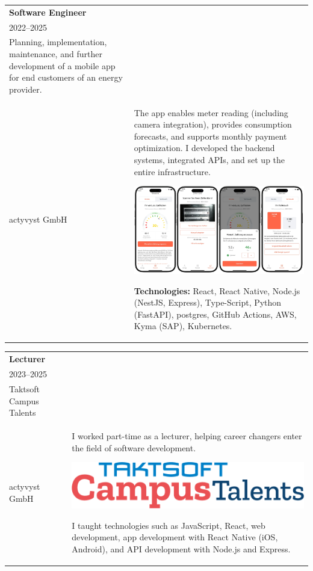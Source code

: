 \documentclass[a4paper,10pt]{article}
\begin{document}
\begin{tabularx}{\textwidth}{>{\raggedright}p{4.5cm}X}
  \textbf{\color{sectionblue}Software Engineer}                                  \\
  {\color{sectiongray}2022–2025}                                                 \\
  \vspace{1.5em}

  Planning, implementation, maintenance, and further development of a mobile app
  for end customers of an energy provider.\@                                     \\ {\color{sectiongray}actyvyst
  GmbH} & The app enables meter reading (including camera integration), provides
  consumption forecasts, and supports monthly payment optimization. I developed
  the backend systems, integrated APIs, and set up the entire infrastructure.
  \begin{center}
    \includegraphics[width=0.8\linewidth]{assets/badenova.png}
  \end{center}
  \textbf{Technologies:} React, React Native, Node.js (NestJS, Express), Type-Script, Python (FastAPI), postgres, GitHub Actions, AWS, Kyma (SAP), Kubernetes.
\end{tabularx}

\vspace{1em}
\noindent{\color{sectionblue}\rule{\textwidth}{0.4pt}}
\vspace{1em}

\begin{tabularx}{\textwidth}{>{\raggedright}p{4.5cm}X}
  \textbf{\color{sectionblue}Lecturer} \\
  {\color{sectiongray}2023–2025}       \\
  \vspace{1.5em}
  Taktsoft Campus Talents              \\
  {\color{sectiongray}actyvyst GmbH}
   &
  I worked part-time as a lecturer, helping career changers enter the field of software development.
  \begin{center}
    \includegraphics[width=0.8\linewidth]{assets/logo-campus-talents.png}
  \end{center}
  I taught technologies such as JavaScript, React, web development, app development with React Native (iOS, Android), and API development with Node.js and Express.
\end{tabularx}
\end{document}

